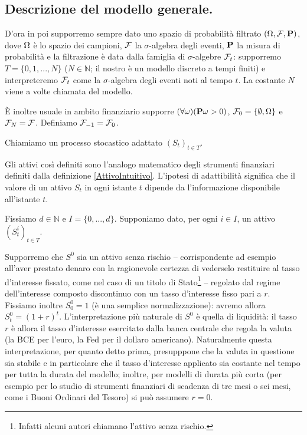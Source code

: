 \subsection{Descrizione del modello generale.}\label{DescrizioneDelModelloGenerale}
\par D'ora in poi supporremo sempre dato uno spazio di probabilit\`a filtrato $(\SamplesSpace,\SigmaAlgebra,\Probability{})$, dove $\Omega$ \`e lo spazio dei campioni, $\mathcal{F}$ la $\sigma$-algebra degli eventi, $\Probability{}$ la misura di probabilit\`a e la filtrazione \`e data dalla famiglia di $\sigma$-algebre $\mathcal{F}_t$: supporremo $T = \lbrace 0, 1, ..., N \rbrace$ ($N \in \mathbb{N}$; il nostro \`e un modello discreto a tempi finiti) e interpreteremo $\mathcal{F}_t$ come la $\sigma$-algebra degli eventi noti al tempo $t$. La costante $N$ viene a volte chiamata  del modello.
\par \`E inoltre usuale in ambito finanziario supporre $(\forall \omega)(\Probability{\omega} > 0)$, $\mathcal{F}_0 = \lbrace \emptyset, \Omega \rbrace$ e $\mathcal{F}_N = \mathcal{F}$. Definiamo $\mathcal{F}_{-1} = \mathcal{F}_0$.
\begin{Definition}
	Chiamiamo  un processo stocastico adattato $(S_t)_{t \in T}$.
\end{Definition} 
\par Gli attivi cos\`i definiti sono l'analogo matematico degli strumenti finanziari definiti dalla definizione \ref{AttivoIntuitivo}. L'ipotesi di adattibilit\`a significa che il valore di un attivo $S_t$ in ogni istante $t$ dipende da l'informazione disponibile all'istante $t$.
\par Fissiamo $d \in \mathbb{N}$ e $I = \lbrace 0, ..., d \rbrace$. Supponiamo dato, per ogni $i \in I$, un attivo $(S^i_t)_{t \in T}$.
\par Supporremo che $S^0$ sia un attivo senza rischio -- corrispondente ad esempio all'aver prestato denaro con la ragionevole certezza di vederselo restituire al tasso d'interesse fissato, come nel caso di un titolo di Stato\footnote{Infatti alcuni autori chiamano  l'attivo senza rischio.} -- regolato dal regime dell'interesse composto discontinuo con un tasso d'interesse fisso pari a $r$. Fissiamo inoltre $S^0_0 = 1$ (\`e una semplice normalizzazione): avremo allora $S^0_t = (1 + r)^t$. L'interpretazione pi\`u naturale di $S^0$ \`e quella di liquidit\`a: il tasso $r$ \`e allora il tasso d'interesse esercitato dalla banca centrale che regola la valuta (la BCE per l'euro, la Fed per il dollaro americano). Naturalmente questa interpretazione, per quanto detto prima, presupppone che la valuta in questione sia stabile e in particolare che il tasso d'interesse applicato sia costante nel tempo per tutta la durata del modello; inoltre, per modelli di durata pi\`u corta (per esempio per lo studio di strumenti finanziari di scadenza di tre mesi o sei mesi, come i Buoni Ordinari del Tesoro) si pu\`o assumere $r = 0$.
